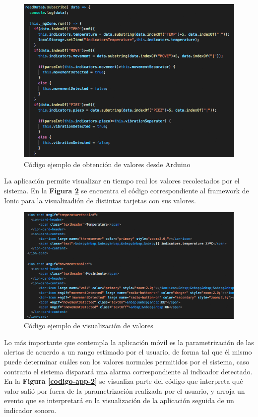 \documentclass{IEEEtran}
\begin{document}
			\begin{figure}
				\centering
				\includegraphics[width=1\linewidth]{codigo-app-1}
				\caption{Código ejemplo de obtención de valores desde Arduino}
				\label{codigo-app-1}
			\end{figure}
			
			La aplicación permite visualizar en tiempo real los valores recolectados por el sistema. En la \textbf{Figura \ref{codigo-app-3}} se encuentra el código correspondiente al framework de Ionic para la visualizadión de distintas tarjetas con sus valores.

			\begin{figure}
				\centering
				\includegraphics[width=1\linewidth]{codigo-app-3}
				\caption{Código ejemplo de visualización de valores}
				\label{codigo-app-3}
			\end{figure}	

			Lo más importante que contempla la aplicación móvil es la parametrización de las alertas de acuerdo a un rango estimado por el usuario, de forma tal que él mismo puede determinar cuáles son los valores normales permitidos por el sistema, caso contrario el sistema disparará una alarma correspondiente al indicador detectado. En la \textbf{Figura \ref{codigo-app-2}} se visualiza parte del código que interpreta qué valor salió por fuera de la parametrización realizada por el usuario, y arroja un evento que se interpretará en la visualización de la aplicación seguida de un indicador sonoro.
\end{document}
